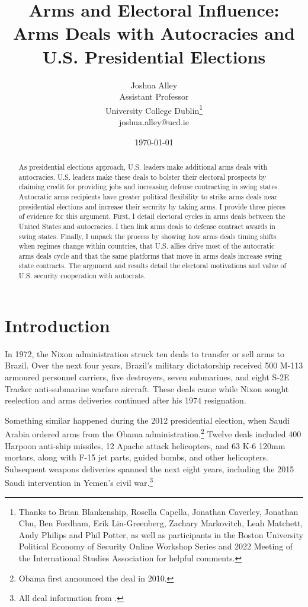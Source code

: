 \documentclass[12pt]{article}
\title{\textbf{Arms and Electoral Influence: Arms Deals with Autocracies and U.S. Presidential Elections}}
\author{Joshua Alley \\
Assistant Professor \\
University College Dublin\thanks{Thanks to Brian Blankenship, Rosella Capella, Jonathan Caverley, Jonathan Chu, Ben Fordham, Erik Lin-Greenberg, Zachary Markovitch, Leah Matchett, Andy Philips and Phil Potter, as well as participants in the Boston University Political Economy of Security Online Workshop Series and 2022 Meeting of the International Studies Association for helpful comments.} \\
joshua.alley@ucd.ie
}
\date{\today}
\begin{document}
\maketitle 

\begin{abstract} 
As presidential elections approach, U.S. leaders make additional arms deals with autocracies. 
U.S. leaders make these deals to bolster their electoral prospects by claiming credit for providing jobs and increasing defense contracting in swing states.
Autocratic arms recipients have greater political flexibility to strike arms deals near presidential elections and increase their security by taking arms. 
I provide three pieces of evidence for this argument.  
First, I detail electoral cycles in arms deals between the United States and autocracies. 
I then link arms deals to defense contract awards in swing states.
Finally, I unpack the process by showing how arms deals timing shifts when regimes change within countries, that U.S. allies drive most of the autocratic arms deals cycle and that the same platforms that move in arms deals increase swing state contracts.  
The argument and results detail the electoral motivations and value of U.S. security cooperation with autocrats. 
\end{abstract} 



\newpage 
\doublespace 


\section{Introduction}



In 1972, the Nixon administration struck ten deals to transfer or sell arms to Brazil.
Over the next four years, Brazil's military dictatorship received 500 M-113 armoured personnel carriers, five destroyers, seven submarines, and eight S-2E Tracker anti-submarine warfare aircraft.
These deals came while Nixon sought reelection and arms deliveries continued after his 1974 resignation. 


Something similar happened during the 2012 presidential election, when Saudi Arabia ordered arms from the Obama administration.\footnote{Obama first announced the deal in 2010.} 
Twelve deals included 400 Harpoon anti-ship missiles, 12 Apache attack helicopters, and 63 K-6 120mm mortars, along with F-15 jet parts, guided bombs, and other helicopters. 
Subsequent weapons deliveries spanned the next eight years, including the 2015 Saudi intervention in Yemen's civil war.\footnote{All deal information from \citep{SIPRI2021}.}
\end{document}
